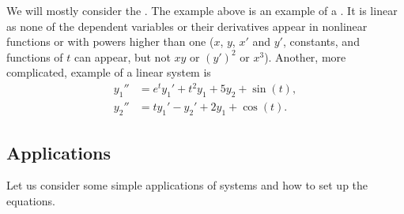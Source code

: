 We will mostly consider the \emph{}.  The example
above is an example of a \emph{}.
It is linear as none of the dependent variables or their derivatives
appear in nonlinear functions or with powers
higher than one ($x$, $y$, $x'$ and $y'$, constants, and functions of $t$
can appear, but not $xy$ or ${(y')}^2$ or $x^3$).  Another, more
complicated, example of a linear system is
\begin{align*}
y_1'' &= e^t y_1' + t^2 y_1 + 5 y_2 + \sin(t), \\
y_2'' &= t y_1'-y_2' + 2 y_1 + \cos(t).
\end{align*}

\subsection{Applications}

Let us consider some simple applications of systems and how to set up the
equations.

